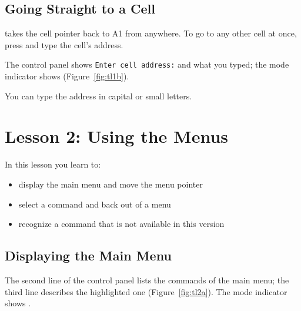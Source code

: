 \subsection{Going Straight to a Cell}
 takes the cell pointer back to A1 from anywhere.  To go to any
other cell at once, press  and type the cell's address.

\begin{Keystrokes}
\end{Keystrokes}
The control panel shows \texttt{Enter cell address:} and what you typed;
the mode indicator shows  (Figure~\ref{fig:tl1b}).

\begin{Keystrokes}
\end{Keystrokes}
You can type the address in capital or small letters.

\section{Lesson 2: Using the Menus}
In this lesson you learn to:
\begin{itemize}
\item display the main menu and move the menu pointer
\item select a command and back out of a menu
\item recognize a command that is not available in this version
\end{itemize}

\subsection{Displaying the Main Menu}
\begin{Keystrokes}
\end{Keystrokes}
The second line of the control panel lists the commands of the main menu;
the third line describes the highlighted one (Figure~\ref{fig:tl2a}).  The
mode indicator shows .

\begin{Keystrokes}
\end{Keystrokes}

